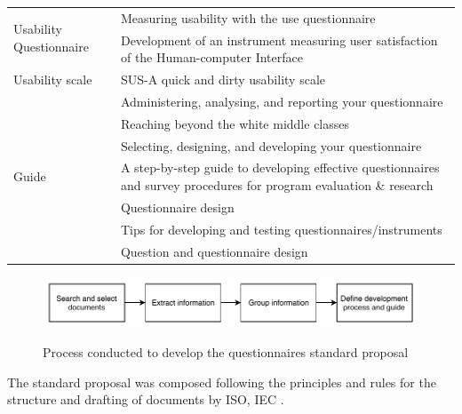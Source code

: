\begin{table}[htp]
{\begin{tabular}{p{3cm}p{11cm}}
\multirow{2}{3cm}{Usability Questionnaire} &
Measuring usability with the use questionnaire \autocite{lund2001measuring}
\\
& Development of an instrument measuring user satisfaction of the Human-computer Interface \autocite{Chin1988}
\\
\midrule
Usability scale
&
SUS-A quick and dirty usability scale \autocite{Brooke1996}
\\
\midrule
\multirow{7}{3cm}{Guide} &
Administering, analysing, and reporting your questionnaire \autocite{Boynton2004}
\\
& Reaching beyond the white middle classes \autocite{Boynton2004b}
\\
& Selecting, designing, and developing your questionnaire \autocite{Boynton2004c}
\\
& A step-by-step guide to developing effective questionnaires and survey procedures for program evaluation \& research \autocite{Diem}
\\
& Questionnaire design \autocite{Crawford1997}
\\
& Tips for developing and testing questionnaires/instruments \autocite{Radhakrishna2007}
\\
& Question and questionnaire design \autocite{Krosnick2009}
\\
\bottomrule
\end{tabular}}
\end{table}

\begin{figure}[htb]
\myfloatalign
{\includegraphics[width=\linewidth]{gfx/standard/MethodStad}} \quad
\caption{Process conducted to develop the questionnaires standard proposal}\label{fig:methods_sta}
\end{figure}

The standard proposal was composed following the principles and rules for the structure and drafting of documents by \ac{ISO}, \ac{IEC} \autocite{ISO2016}.

